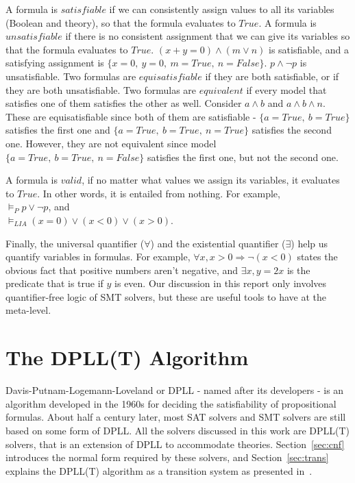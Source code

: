 \documentclass{article}
\begin{document}
A formula is $satisfiable$ if we can consistently assign
values to all its variables (Boolean and theory), 
so that the formula evaluates to $True$. A formula is 
$unsatisfiable$ if there is no consistent assignment that 
we can give its variables so that the formula evaluates to 
$True$. $(x + y = 0) \land (m \lor n)$ is satisfiable, 
and a satisfying assignment is $\{x = 0,\ y = 0,\ m = True,\ 
n = False\}$. $p \land \neg p$ is unsatisfiable. Two formulas 
are $equisatisfiable$ if they are both satisfiable, or if they 
are both unsatisfiable. Two formulas are $equivalent$ 
if every model that satisfies 
one of them satisfies the other as well. Consider 
$a \land b$ and $a \land b \land n$. These are 
equisatisfiable since both of them are satisfiable - 
$\{a = True,\ b = True\}$ satisfies the first one and 
$\{a = True,\ b = True,\ n = True\}$ satisfies the second one.
However, they are not equivalent since model 
$\{a = True,\ b = True,\ n = False\}$ satisfies the first one, 
but not the second one.

A formula is $valid$, if no matter what values we assign its 
variables, it evaluates to $True$. In other words, it is
entailed from nothing. For example, \\
$\models_P p \lor \neg p$, and \\
$\models_{LIA} (x = 0) \lor (x < 0) \lor (x > 0)$.

Finally, the universal quantifier ($\forall$) and 
the existential quantifier ($\exists$) help us quantify 
variables in formulas. For example, $\forall x, x > 0 
\Rightarrow \neg (x < 0)$ states the obvious fact that 
positive numbers aren't negative, and $\exists x, y = 2x$ 
is the predicate that is true if $y$ is even. Our discussion 
in this report only involves quantifier-free logic of SMT 
solvers, but these are useful tools to have at the meta-level.


\section{The DPLL(T) Algorithm}
\label{sec:dpll}
Davis-Putnam-Logemann-Loveland or DPLL - named after its 
developers - is an algorithm developed in the 1960s 
for deciding the satisfiability of propositional formulas.
About half a century later, most SAT solvers and SMT solvers
are still based on some form of DPLL. All the solvers 
discussed in this work are DPLL(T) solvers, that is an 
extension of DPLL to accommodate theories. 
Section~\ref{sec:cnf}
introduces the normal form required by these solvers, 
and Section~\ref{sec:trans} explains the DPLL(T) algorithm as a 
transition system as presented 
in~\cite{DBLP:conf/fmcad/KatzBTRH16}.
\end{document}
